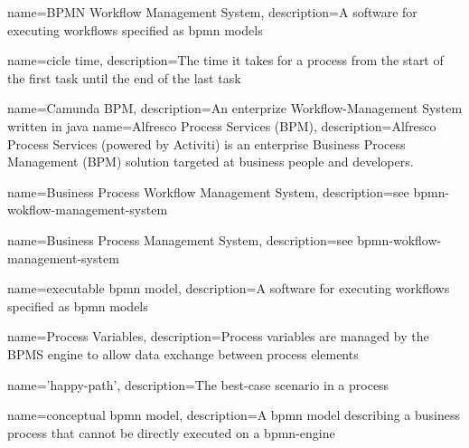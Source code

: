 
{
	name={BPMN Workflow Management System},
	description={A software for executing workflows specified as \gls{bpmn} models}
}

{
	name={cicle time},
	description={The time it takes for a process from the start of the first task until the end of the last task \cite{Six-sigma-terms}}
}

{
	name={Camunda BPM},
	description={An enterprize Workflow-Management System written in java \cite{camunda-description}}
}
{
	name={Alfresco Process Services (BPM)},
	description={Alfresco Process Services (powered by Activiti) is an enterprise Business Process Management (BPM) solution targeted at business people and developers. \cite{alfresco-description}}
}


{
	name={Business Process Workflow Management System},
	description={see \gls{bpmn-wokflow-management-system}}
}

{
	name={Business Process Management System},
	description={see \gls{bpmn-wokflow-management-system}}
}

{
	name={executable \gls{bpmn} model},
	description={A software for executing workflows specified as \gls{bpmn} models}
}

{
	name={Process Variables},
	description={Process variables are managed by the BPMS engine to allow data exchange between process elements}
}

{
	name={'happy-path'},
	description={The best-case scenario in a process}
}

{
	name={conceptual \gls{bpmn} model},
	description={A \gls{bpmn} model describing a business process that cannot be directly executed on a \gls{bpmn-engine}}
}

